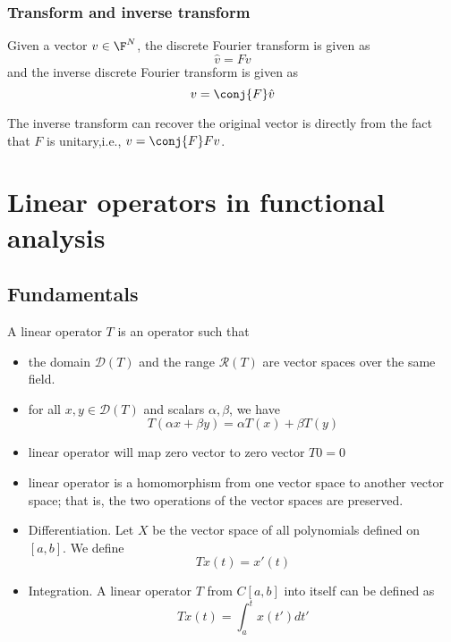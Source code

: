 \begin{refsection}
\subsubsection{Transform and inverse transform}

\begin{definition}
	Given a vector $v\in \F^N$, the discrete Fourier transform is given as
	$$\hat{v} = Fv$$
	and the inverse discrete Fourier transform is given as
	$$v = \conj{F}\hat{v}$$
\end{definition}

\begin{remark}
	The inverse transform can recover the original vector is directly from the fact that $F$ is unitary,i.e., $v= \conj{F}Fv$.
\end{remark}





\section{Linear operators in functional analysis}
\subsection{Fundamentals}
\begin{definition}
A linear operator $T$ is an operator such that
\begin{itemize}
    \item the domain $\mathcal{D}(T)$ and the range $\mathcal{R}(T)$ are vector spaces over the same field.
    \item for all $x,y \in \mathcal{D}(T)$ and scalars $\alpha,\beta$, we have 
    $$T(\alpha x +  \beta y )= \alpha T(x) + \beta T(y) $$
\end{itemize}
\end{definition}

\begin{remark}\hfill
\begin{itemize}
    \item linear operator will map zero vector to zero vector $T 0 = 0$
    \item linear operator is a homomorphism from one vector space to another vector space; that is, the two operations of the vector spaces are preserved. 
\end{itemize}
\end{remark}

\begin{example}\hfill
\begin{itemize}
    \item Differentiation. Let $X$ be the vector space of all polynomials defined on $[a,b]$. We define $$Tx(t) =x'(t)$$
    \item Integration. A linear operator $T$ from $C[a,b]$ into itself can be defined as
    $$Tx(t) =\int_a^t x(t')dt'$$
\end{itemize}
\end{example}


\end{refsection}
